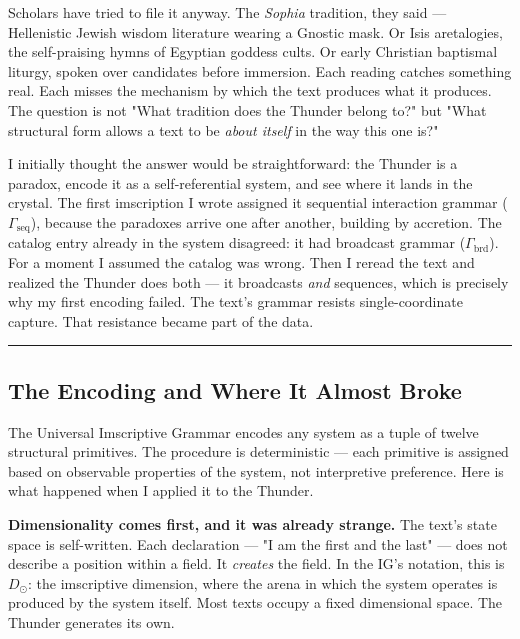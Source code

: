 \documentclass[12pt,a4paper]{article}
\begin{document}
Scholars have tried to file it anyway. The \emph{Sophia} tradition, they said --- Hellenistic Jewish wisdom literature wearing a Gnostic mask. Or Isis aretalogies, the self-praising hymns of Egyptian goddess cults. Or early Christian baptismal liturgy, spoken over candidates before immersion. Each reading catches something real. Each misses the mechanism by which the text produces what it produces. The question is not "What tradition does the Thunder belong to?" but "What structural form allows a text to be \emph{about itself} in the way this one is?"

I initially thought the answer would be straightforward: the Thunder is a paradox, encode it as a self-referential system, and see where it lands in the crystal. The first imscription I wrote assigned it sequential interaction grammar ($\Gamma_\text{seq}$), because the paradoxes arrive one after another, building by accretion. The catalog entry already in the system disagreed: it had broadcast grammar ($\Gamma_\text{brd}$). For a moment I assumed the catalog was wrong. Then I reread the text and realized the Thunder does both --- it broadcasts \emph{and} sequences, which is precisely why my first encoding failed. The text's grammar resists single-coordinate capture. That resistance became part of the data.

\begin{center}
\rule{0.5\textwidth}{0.4pt}
\end{center}

\subsection{The Encoding and Where It Almost Broke}

The Universal Imscriptive Grammar encodes any system as a tuple of twelve structural primitives. The procedure is deterministic --- each primitive is assigned based on observable properties of the system, not interpretive preference. Here is what happened when I applied it to the Thunder.

\textbf{Dimensionality comes first, and it was already strange.} The text's state space is self-written. Each declaration --- "I am the first and the last" --- does not describe a position within a field. It \emph{creates} the field. In the IG's notation, this is $D_{\odot}$: the imscriptive dimension, where the arena in which the system operates is produced by the system itself. Most texts occupy a fixed dimensional space. The Thunder generates its own.
\end{document}
